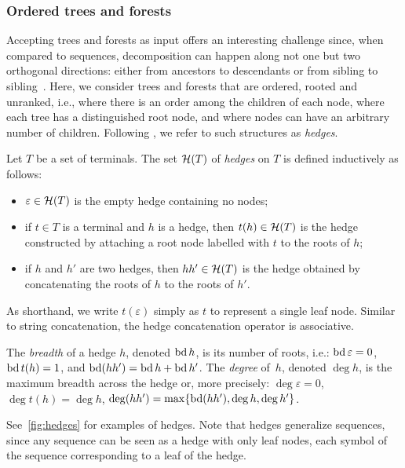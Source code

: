 \subsubsection{Ordered trees and forests}

Accepting trees and forests as input offers an interesting challenge since, when compared to sequences, decomposition can happen along not one but two orthogonal directions: either from ancestors to descendants or from sibling to sibling~\parencite{Berkemer2017AlgebraicDynamicProgramming}.
Here, we consider trees and forests that are ordered, rooted and unranked, i.e.,
where there is an order among the children of each node,
where each tree has a distinguished root node,
and where nodes can have an arbitrary number of children.
Following \textcite{BruggemannKlein2001RegularTreeRegular}, we refer to such structures as \emph{hedges}.

\begin{definition}[Hedges]
    Let \(T\) be a set of terminals.
    The set \(\mathcal{H}(T)\) of \emph{hedges} on \(T\) is defined inductively as follows:
    \begin{itemize}
        \item \(\varepsilon \in \mathcal{H}(T)\) is the empty hedge containing no nodes;
        \item if \(t \in T\) is a terminal and \(h\) is a hedge, then \(t(h) \in \mathcal{H}(T)\) is the hedge constructed by attaching a root node labelled with \(t\) to the roots of \(h\);
        \item if \(h\) and \(h'\) are two hedges, then \(hh' \in \mathcal{H}(T)\) is the hedge obtained by concatenating the roots of \(h\) to the roots of \(h'\).
    \end{itemize}
    As shorthand, we write \(t(\varepsilon)\) simply as \(t\) to represent a single leaf node.
    Similar to string concatenation, the hedge concatenation operator is associative.

    The \emph{breadth} of a hedge \(h\), denoted \(\operatorname{bd} h\), is its number of roots, i.e.:
    \(\operatorname{bd}{\varepsilon} = 0\),
    \(\operatorname{bd}{t(h)} = 1\),
    and \(\operatorname{bd}(hh') = \operatorname{bd}{h} + \operatorname{bd}{h'}\).
    The \emph{degree} of~\(h\), denoted \(\deg h\), is the maximum breadth across the hedge or, more precisely:
    \(\deg{\varepsilon} = 0\),
    \(\deg{t(h)} = \deg h\),
    \(\deg(hh') = \max\{\operatorname{bd}(hh'), \deg h, \deg h'\}\).
\end{definition}
See~\cref{fig:hedges} for examples of hedges.
Note that hedges generalize sequences, since any sequence can be seen as a hedge with only leaf nodes, each symbol of the sequence corresponding to a leaf of the hedge.

